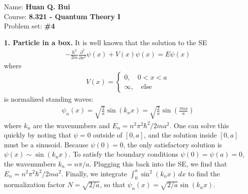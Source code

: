 \documentclass{article}
\theoremstyle{definition}
\newcommand{\p}{\partial}
\newcommand{\f}[2]{\frac{#1}{#2}}
\newcommand{\lp}{\left(}
\newcommand{\rp}{\right)}
\begin{document}
\begin{framed}
\noindent Name: \textbf{Huan Q. Bui}\\
Course: \textbf{8.321 - Quantum Theory I}\\
Problem set: \textbf{\#4}
\end{framed}
	




\noindent \textbf{1. Particle in a box.} It is well known that the solution to the SE
\begin{align*}
-\f{\hbar^2}{2m}\f{\p^2}{\p x^2}\psi(x) + V(x)\psi(x) = E\psi(x)
\end{align*}
where 
\begin{align*}
V(x) = \begin{cases}
0, \quad 0 < x < a\\
\infty, \quad \text{else}
\end{cases}
\end{align*}
is normalized standing waves:
\begin{align*}
\psi_n(x) = \sqrt{\f{2}{a}}\sin(k_n x) = \sqrt{\f{2}{a}}\sin\lp \f{\pi n x}{a} \rp
\end{align*}
where $k_n$ are the wavenumbers and $E_n = n^2\pi^2 \hbar^2 / 2ma^2$. One can solve this quickly by noting that $\psi = 0$ outside of $[0,a]$, and the solution inside $[0,a]$ must be a sinusoid. Because $\psi(0) = 0$, the only satisfactory solution is $\psi(x) \sim \sin(k_n x)$. To satisfy the boundary conditions $\psi(0) = \psi(a) = 0$, the wavenumbers $k_n = n\pi/a$. Plugging this back into the SE, we find that $E_n = n^2\pi^2\hbar^2/2ma^2$. Finally, we integrate $\int_0^a \sin^2(k_n x)\,dx$ to find the normalization factor $N = \sqrt{2/a}$, so that $\psi_n(x) = \sqrt{2/a}\sin(k_n x)$. \\
\end{document}
